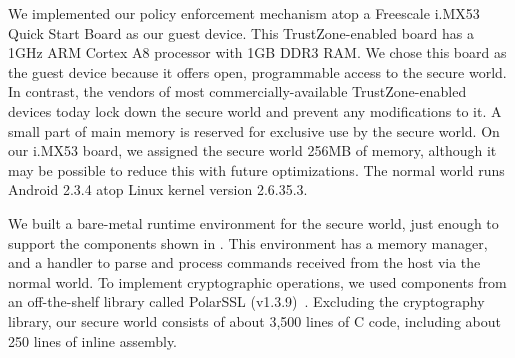 \label{section:evaluation}

We implemented our policy enforcement mechanism atop a Freescale i.MX53 Quick
Start Board as our guest device. This TrustZone-enabled board has a 1GHz ARM
Cortex A8 processor with 1GB DDR3 RAM. We chose this board as the guest device
because it offers open, programmable access to the secure world. In contrast,
the vendors of most commercially-available TrustZone-enabled devices today lock
down the secure world and prevent any modifications to it. A small part of main
memory is reserved for exclusive use by the secure world. On our i.MX53 board,
we assigned the secure world 256MB of memory, although it may be possible to
reduce this with future optimizations. The normal world runs Android 2.3.4 atop
Linux kernel version 2.6.35.3.

We built a bare-metal runtime environment for the secure world, just enough to
support the components shown in . This environment has a
memory manager, and a handler to parse and process commands received from the
host via the normal world. To implement cryptographic operations, we used
components from an off-the-shelf library called PolarSSL
(v1.3.9)~\cite{polarssl}.  Excluding the cryptography library, our secure world
consists of about 3,500 lines of C code, including about 250 lines of inline
assembly.  
%
%

